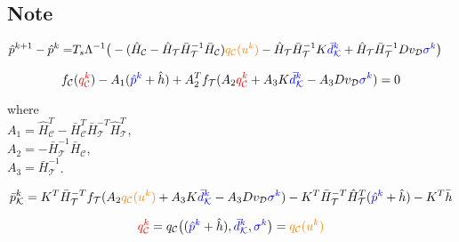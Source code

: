 


\frontmatter
{}

\subsection{Note}

\begin{align}
\label{WT_matrixform_final_discrete1}
\nonumber  \hat{p}^{k+1} - \hat{p}^{k}   =& T_s \Lambda^{-1} \big(- (\hat{H}_{\mathcal{C}} - \hat{H}_{\mathcal{T}} \bar{H}^{-1}_{\mathcal{T}}\bar{H}_{\mathcal{C}})  \textcolor{orange}{q_{\mathcal{C}}(u^k)}  - \hat{H}_{\mathcal{T}} \bar{H}^{-1}_{\mathcal{T}} K \textcolor{blue}{\bar{d}^{k}_{\mathcal{K}}} + \hat{H}_{\mathcal{T}} \bar{H}^{-1}_{\mathcal{T}} D v_{\mathcal{D}} \textcolor{blue}{\sigma^{k}} \big) 
\end{align}


 \begin{equation}
\label{meshresult2_WT_model1}
f_{\mathcal{C}}(\textcolor{red}{q^k_\mathcal{C}}) - A_1(\textcolor{blue}{\hat{p}^k} + \hat{h}) + A_2^T f_{\mathcal{T}}(A_2 \textcolor{red}{q^k_\mathcal{C}} + A_3 K \textcolor{blue}{\bar{d}^k_{\mathcal{K}}} - A_3 D v_{\mathcal{D}} \textcolor{blue}{\sigma^k}) = 0
\end{equation} 

\begin{minipage}[t]{0.4\textwidth}
where\\
\hspace*{8mm} $A_1 = \hat{H}^T_{\mathcal{C}} -\bar{H}^T_{\mathcal{C}}\bar{H}^{-T}_{\mathcal{T}}\hat{H}^T_{\mathcal{T}}$, \vspace*{1.5mm}  \\
\hspace*{8mm} $A_2 = -\bar{H}^{-1}_{\mathcal{T}} \bar{H}_{\mathcal{C}} $, \vspace*{1.5mm}\\
\hspace*{8mm} $A_3 = \bar{H}^{-1}_{\mathcal{T}}$.
\end{minipage}

\begin{equation}
  \label{non-inlet_p_WT1}
  \bar{p}^k_{\mathcal{K}} = K^T \bar{H}^{-T}_{\mathcal{T}}f_{\mathcal{T}}(A_2 \textcolor{orange}{q_{\mathcal{C}}(u^k)} + A_3 K \textcolor{blue}{\bar{d}^k_{\mathcal{K}}} - A_3 D v_{\mathcal{D}} \textcolor{blue}{\sigma^k}) - K^T\bar{H}^{-T}_{\mathcal{T}}\hat{H}^{T}_{\mathcal{T}} (\textcolor{blue}{\hat{p}^k} + \hat{h}) - K^T\bar{h} 
\end{equation}

 \begin{equation}
\label{qc_abstraction}
\textcolor{red}{q^{k}_{\mathcal{C}}} = q_{\mathcal{C}} \big( (\textcolor{blue}{\hat{p}^{k}} + \hat{h}),\textcolor{blue}{\bar{d}^{k}_{\mathcal{K}}}, \textcolor{blue}{\sigma^{k}} \big) = \textcolor{orange}{q_{\mathcal{C}}(u^k)}
\end{equation} 




